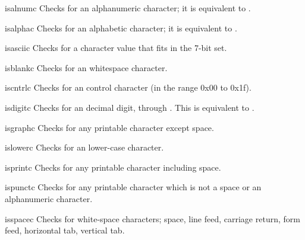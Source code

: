 \begin{funcdesc}{isalnum}{c}
Checks for an \ASCII{} alphanumeric character; it is equivalent to
.
\end{funcdesc}

\begin{funcdesc}{isalpha}{c}
Checks for an \ASCII{} alphabetic character; it is equivalent to
.
\end{funcdesc}

\begin{funcdesc}{isascii}{c}
Checks for a character value that fits in the 7-bit \ASCII{} set.
\end{funcdesc}

\begin{funcdesc}{isblank}{c}
Checks for an \ASCII{} whitespace character.
\end{funcdesc}

\begin{funcdesc}{iscntrl}{c}
Checks for an \ASCII{} control character (in the range 0x00 to 0x1f).
\end{funcdesc}

\begin{funcdesc}{isdigit}{c}
Checks for an \ASCII{} decimal digit,  through
.  This is equivalent to .
\end{funcdesc}

\begin{funcdesc}{isgraph}{c}
Checks for \ASCII{} any printable character except space.
\end{funcdesc}

\begin{funcdesc}{islower}{c}
Checks for an \ASCII{} lower-case character.
\end{funcdesc}

\begin{funcdesc}{isprint}{c}
Checks for any \ASCII{} printable character including space.
\end{funcdesc}

\begin{funcdesc}{ispunct}{c}
Checks for any printable \ASCII{} character which is not a space or an
alphanumeric character.
\end{funcdesc}

\begin{funcdesc}{isspace}{c}
Checks for \ASCII{} white-space characters; space, line feed,
carriage return, form feed, horizontal tab, vertical tab.
\end{funcdesc}

